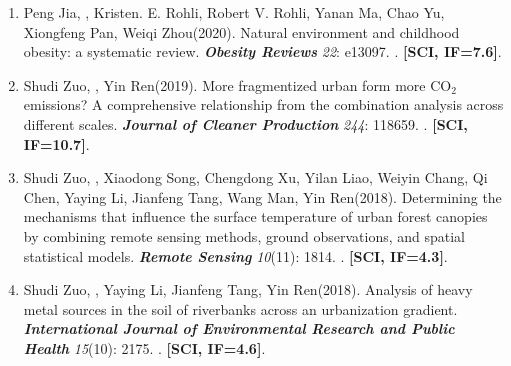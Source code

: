 \begin{enumerate}
    . 
    \textbf{[SCI/SSCI, IF=4.1]}.
\item
    Peng Jia\CS, \Shaoqing, Kristen. E. Rohli, Robert V. Rohli, Yanan Ma, Chao Yu, Xiongfeng Pan, Weiqi Zhou\CS (2020).
    Natural environment and childhood obesity: a systematic review.
    \textbf{\textit{Obesity Reviews}} \textit{22}: e13097.
    . 
    \textbf{[SCI, IF=7.6]}.
\item
    Shudi Zuo, \Shaoqing, Yin Ren\CS (2019).
    More fragmentized urban form more CO$_2$ emissions? A comprehensive relationship from the combination analysis across different scales.
    \textbf{\textit{Journal of Cleaner Production}} \textit{244}: 118659.
    . 
    \textbf{[SCI, IF=10.7]}.
\item
    Shudi Zuo, \Shaoqing, Xiaodong Song, Chengdong Xu, Yilan Liao, Weiyin Chang, Qi Chen, Yaying Li, Jianfeng Tang, Wang Man, Yin Ren\CS (2018).
    Determining the mechanisms that influence the surface temperature of urban forest canopies by combining remote sensing methods, ground observations, and spatial statistical models. 
    \textbf{\textit{Remote Sensing}} \textit{10}(11): 1814.
    . 
    \textbf{[SCI, IF=4.3]}.
\item
    Shudi Zuo, \Shaoqing, Yaying Li, Jianfeng Tang, Yin Ren\CS (2018).
    Analysis of heavy metal sources in the soil of riverbanks across an urbanization gradient.
    \textbf{\textit{International Journal of Environmental Research and Public Health}} \textit{15}(10): 2175.
    . 
    \textbf{[SCI, IF=4.6]}.
\end{enumerate}

